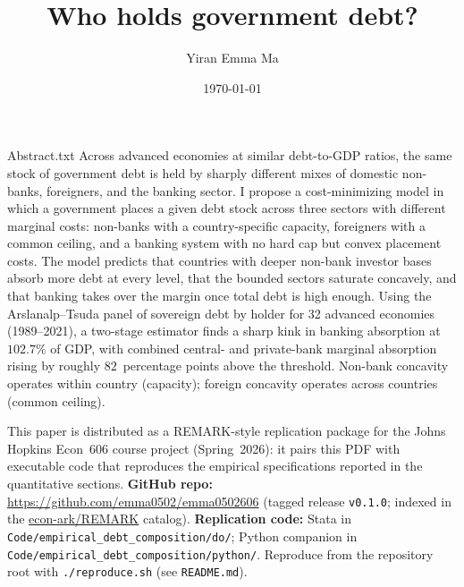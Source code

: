\documentclass[\latexroot/\projectname]{subfiles}
\begin{document}
\webonly{
  \newcommand{\versn}{Web}
}

\title{Who holds government debt?}

\author{Yiran Emma Ma}



\date{\today}

\maketitle
\vspace{-0.5\baselineskip}

\whenintegrated{\label{abstract}} %
\begin{verbatimwrite}{Abstract.txt}
\noindent
Across advanced economies at similar debt-to-GDP ratios, the same stock of government debt is held by sharply different mixes of domestic non-banks, foreigners, and the banking sector.
I propose a cost-minimizing model in which a government places a given debt stock across three sectors with different marginal costs: non-banks with a country-specific capacity, foreigners with a common ceiling, and a banking system with no hard cap but convex placement costs.
The model predicts that countries with deeper non-bank investor bases absorb more debt at every level, that the bounded sectors saturate concavely, and that banking takes over the margin once total debt is high enough.
Using the Arslanalp--Tsuda panel of sovereign debt by holder for 32 advanced economies (1989--2021), a two-stage estimator finds a sharp kink in banking absorption at $102.7\%$ of GDP, with combined central- and private-bank marginal absorption rising by roughly $82$~percentage points above the threshold.
Non-bank concavity operates within country (capacity); foreign concavity operates across countries (common ceiling).
\end{verbatimwrite}
\begin{abstract}
  
\end{abstract}
\vspace{-0.5\baselineskip}

\begin{footnotesize}
  \noindent
  This paper is distributed as a REMARK-style replication package for the Johns Hopkins Econ~606 course project (Spring~2026): it pairs this PDF with executable code that reproduces the empirical specifications reported in the quantitative sections.
  \textbf{GitHub repo:} \url{https://github.com/emma0502/emma0502606}
  (tagged release \texttt{v0.1.0}; indexed in the \href{https://github.com/econ-ark/REMARK}{econ-ark/REMARK} catalog).
  \textbf{Replication code:} Stata in \texttt{Code/empirical\_debt\_composition/do/}; Python companion in \texttt{Code/empirical\_debt\_composition/python/}.
  Reproduce from the repository root with \texttt{./reproduce.sh} (see \texttt{README.md}).
\end{footnotesize}
\vspace{0.5\baselineskip}
\end{document}
